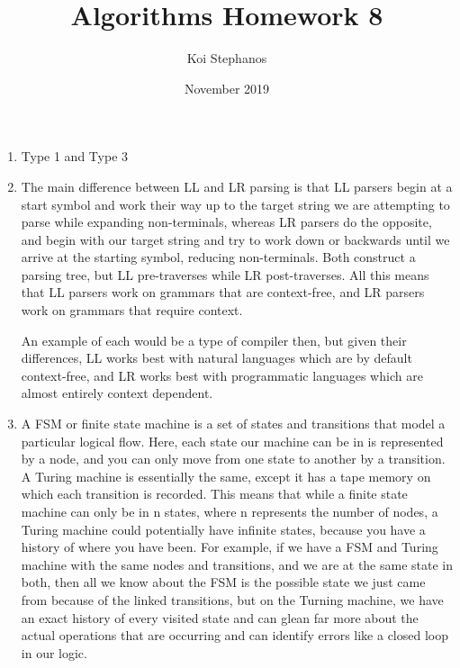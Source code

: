 \documentclass{article}
\title{Algorithms Homework 8}
\author{Koi Stephanos}
\date{November 2019}
\begin{document}
\maketitle

\begin{enumerate}
\item
    Type 1 and Type 3

\item
    The main difference between LL and LR parsing is that LL parsers begin at a start symbol and work their way up to the target string we are attempting to parse while expanding non-terminals, whereas LR parsers do the opposite, and begin with our target string and try to work down or backwards until we arrive at the starting symbol, reducing non-terminals. Both construct a parsing tree, but LL pre-traverses while LR post-traverses. All this means that LL parsers work on grammars that are context-free, and LR parsers work on grammars that require context.
    
    An example of each would be a type of compiler then, but given their differences, LL works best with natural languages which are by default context-free, and LR works best with programmatic languages which are almost entirely context dependent.
    
\item
    A FSM or finite state machine is a set of states and transitions that model a particular logical flow. Here, each state our machine can be in is represented by a node, and you can only move from one state to another by a transition. A Turing machine is essentially the same, except it has a tape memory on which each transition is recorded. This means that while a finite state machine can only be in n states, where n represents the number of nodes, a Turing machine could potentially have infinite states, because you have a history of where you have been. For example, if we have a FSM and Turing machine with the same nodes and transitions, and we are at the same state in both, then all we know about the FSM is the possible state we just came from because of the linked transitions, but on the Turning machine, we have an exact history of every visited state and can glean far more about the actual operations that are occurring and can identify errors like a closed loop in our logic.


\end{enumerate}
\end{document}
